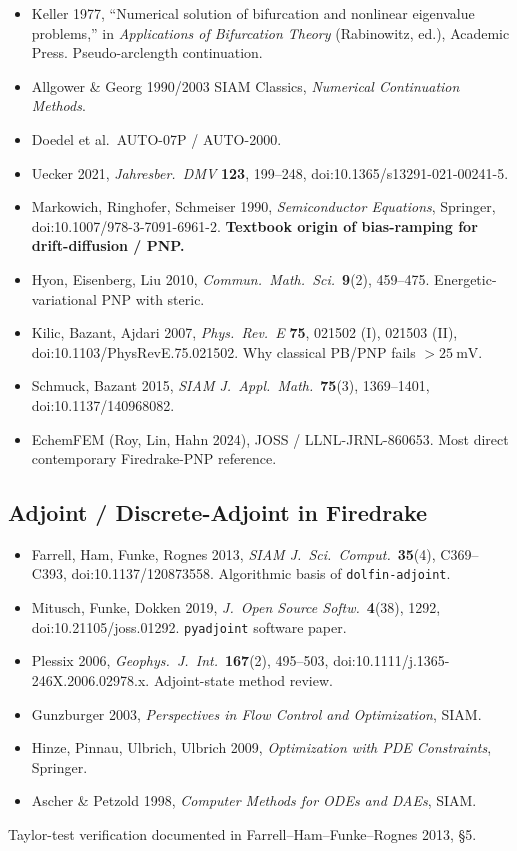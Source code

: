 \documentclass[11pt]{article}
\begin{document}
\begin{itemize}
\item Keller 1977, ``Numerical solution of bifurcation and nonlinear
      eigenvalue problems,'' in \emph{Applications of Bifurcation Theory}
      (Rabinowitz, ed.), Academic Press. Pseudo-arclength continuation.
\item Allgower \& Georg 1990/2003 SIAM Classics, \emph{Numerical Continuation
      Methods}.
\item Doedel et al.\ AUTO-07P / AUTO-2000.
\item Uecker 2021, \emph{Jahresber.~DMV} \textbf{123}, 199--248,
      doi:10.1365/s13291-021-00241-5.
\item Markowich, Ringhofer, Schmeiser 1990, \emph{Semiconductor Equations},
      Springer, doi:10.1007/978-3-7091-6961-2. \textbf{Textbook origin of
      bias-ramping for drift-diffusion / PNP.}
\item Hyon, Eisenberg, Liu 2010, \emph{Commun.~Math.~Sci.}\ \textbf{9}(2),
      459--475. Energetic-variational PNP with steric.
\item Kilic, Bazant, Ajdari 2007, \emph{Phys.~Rev.~E} \textbf{75}, 021502
      (I), 021503 (II), doi:10.1103/PhysRevE.75.021502. Why classical PB/PNP
      fails $>\SI{25}{\milli\volt}$.
\item Schmuck, Bazant 2015, \emph{SIAM J.~Appl.~Math.}\ \textbf{75}(3),
      1369--1401, doi:10.1137/140968082.
\item EchemFEM (Roy, Lin, Hahn 2024), JOSS / LLNL-JRNL-860653. Most direct
      contemporary Firedrake-PNP reference.
\end{itemize}

\subsection{Adjoint / Discrete-Adjoint in Firedrake}

\begin{itemize}
\item Farrell, Ham, Funke, Rognes 2013, \emph{SIAM J.~Sci.~Comput.}\
      \textbf{35}(4), C369--C393, doi:10.1137/120873558. Algorithmic basis of
      \texttt{dolfin-adjoint}.
\item Mitusch, Funke, Dokken 2019, \emph{J.~Open Source Softw.}\ \textbf{4}(38),
      1292, doi:10.21105/joss.01292. \texttt{pyadjoint} software paper.
\item Plessix 2006, \emph{Geophys.~J.~Int.}\ \textbf{167}(2), 495--503,
      doi:10.1111/j.1365-246X.2006.02978.x. Adjoint-state method review.
\item Gunzburger 2003, \emph{Perspectives in Flow Control and Optimization},
      SIAM.
\item Hinze, Pinnau, Ulbrich, Ulbrich 2009, \emph{Optimization with PDE
      Constraints}, Springer.
\item Ascher \& Petzold 1998, \emph{Computer Methods for ODEs and DAEs}, SIAM.
\end{itemize}
Taylor-test verification documented in Farrell--Ham--Funke--Rognes 2013, \S5.
\end{document}
